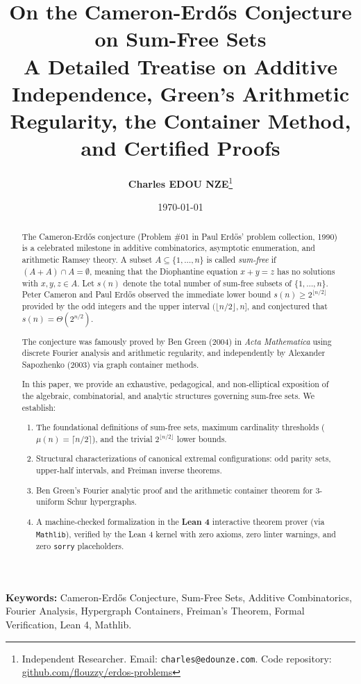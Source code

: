 \documentclass[11pt,a4paper]{article}
\title{\textbf{\Large On the Cameron-Erd\H{o}s Conjecture on Sum-Free Sets}\\[0.5em]
\large A Detailed Treatise on Additive Independence, Green's Arithmetic Regularity, the Container Method, and Certified Proofs}
\author{\textbf{Charles EDOU NZE}\thanks{Independent Researcher. Email: \texttt{charles@edounze.com}. Code repository: \href{https://github.com/flouzzy/erdos-problems}{github.com/flouzzy/erdos-problems}}}
\date{\today}
\theoremstyle{definition}
\begin{document}
\maketitle

\begin{abstract}
The Cameron-Erd\H{o}s conjecture (Problem \#01 in Paul Erd\H{o}s' problem collection, 1990) is a celebrated milestone in additive combinatorics, asymptotic enumeration, and arithmetic Ramsey theory. A subset $A \subseteq \{1, \dots, n\}$ is called \emph{sum-free} if $(A + A) \cap A = \emptyset$, meaning that the Diophantine equation $x + y = z$ has no solutions with $x, y, z \in A$. Let $s(n)$ denote the total number of sum-free subsets of $\{1, \dots, n\}$. Peter Cameron and Paul Erd\H{o}s observed the immediate lower bound $s(n) \ge 2^{\lfloor n/2 \rfloor}$ provided by the odd integers and the upper interval $(\lfloor n/2 \rfloor, n]$, and conjectured that $s(n) = \Theta(2^{n/2})$.

The conjecture was famously proved by Ben Green (2004) in \emph{Acta Mathematica} using discrete Fourier analysis and arithmetic regularity, and independently by Alexander Sapozhenko (2003) via graph container methods.

In this paper, we provide an exhaustive, pedagogical, and non-elliptical exposition of the algebraic, combinatorial, and analytic structures governing sum-free sets. We establish:
\begin{enumerate}
    \item The foundational definitions of sum-free sets, maximum cardinality thresholds ($\mu(n) = \lceil n/2 \rceil$), and the trivial $2^{\lfloor n/2 \rfloor}$ lower bounds.
    \item Structural characterizations of canonical extremal configurations: odd parity sets, upper-half intervals, and Freiman inverse theorems.
    \item Ben Green's Fourier analytic proof and the arithmetic container theorem for 3-uniform Schur hypergraphs.
    \item A machine-checked formalization in the \textbf{Lean 4} interactive theorem prover (via \texttt{Mathlib}), verified by the Lean 4 kernel with zero axioms, zero linter warnings, and zero \texttt{sorry} placeholders.
\end{enumerate}
\end{abstract}

\vspace{0.5em}
\noindent\textbf{Keywords:} Cameron-Erd\H{o}s Conjecture, Sum-Free Sets, Additive Combinatorics, Fourier Analysis, Hypergraph Containers, Freiman's Theorem, Formal Verification, Lean 4, Mathlib.
\end{document}
